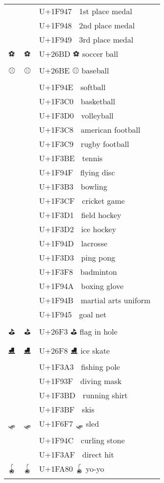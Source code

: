\documentclass[a4paper,12pt]{ltjarticle}
\newcommand{\fontA}[1]{{\fontspec[RawFeature={mode=harf,+dist,+ccmp}]{Segoe UI Emoji} #1}}
\newcommand{\fontB}[1]{{\fontspec[RawFeature={mode=harf,+dist,+ccmp}]{Noto Color Emoji} #1}}
\begin{document}
\begin{longtable}[c]{ccp{0.8\linewidth}}
\fontA{🥇}&\fontB{🥇}&U+1F947 🥇 1st place medal\\
\fontA{🥈}&\fontB{🥈}&U+1F948 🥈 2nd place medal\\
\fontA{🥉}&\fontB{🥉}&U+1F949 🥉 3rd place medal\\
\fontA{⚽}&\fontB{⚽}&U+26BD ⚽ soccer ball\\
\fontA{⚾}&\fontB{⚾}&U+26BE ⚾ baseball\\
\fontA{🥎}&\fontB{🥎}&U+1F94E 🥎 softball\\
\fontA{🏀}&\fontB{🏀}&U+1F3C0 🏀 basketball\\
\fontA{🏐}&\fontB{🏐}&U+1F3D0 🏐 volleyball\\
\fontA{🏈}&\fontB{🏈}&U+1F3C8 🏈 american football\\
\fontA{🏉}&\fontB{🏉}&U+1F3C9 🏉 rugby football\\
\fontA{🎾}&\fontB{🎾}&U+1F3BE 🎾 tennis\\
\fontA{🥏}&\fontB{🥏}&U+1F94F 🥏 flying disc\\
\fontA{🎳}&\fontB{🎳}&U+1F3B3 🎳 bowling\\
\fontA{🏏}&\fontB{🏏}&U+1F3CF 🏏 cricket game\\
\fontA{🏑}&\fontB{🏑}&U+1F3D1 🏑 field hockey\\
\fontA{🏒}&\fontB{🏒}&U+1F3D2 🏒 ice hockey\\
\fontA{🥍}&\fontB{🥍}&U+1F94D 🥍 lacrosse\\
\fontA{🏓}&\fontB{🏓}&U+1F3D3 🏓 ping pong\\
\fontA{🏸}&\fontB{🏸}&U+1F3F8 🏸 badminton\\
\fontA{🥊}&\fontB{🥊}&U+1F94A 🥊 boxing glove\\
\fontA{🥋}&\fontB{🥋}&U+1F94B 🥋 martial arts uniform\\
\fontA{🥅}&\fontB{🥅}&U+1F945 🥅 goal net\\
\fontA{⛳}&\fontB{⛳}&U+26F3 ⛳ flag in hole\\
\fontA{⛸}&\fontB{⛸}&U+26F8 ⛸ ice skate\\
\fontA{🎣}&\fontB{🎣}&U+1F3A3 🎣 fishing pole\\
\fontA{🤿}&\fontB{🤿}&U+1F93F 🤿 diving mask\\
\fontA{🎽}&\fontB{🎽}&U+1F3BD 🎽 running shirt\\
\fontA{🎿}&\fontB{🎿}&U+1F3BF 🎿 skis\\
\fontA{🛷}&\fontB{🛷}&U+1F6F7 🛷 sled\\
\fontA{🥌}&\fontB{🥌}&U+1F94C 🥌 curling stone\\
\fontA{🎯}&\fontB{🎯}&U+1F3AF 🎯 direct hit\\
\fontA{🪀}&\fontB{🪀}&U+1FA80 🪀 yo-yo\\

\end{longtable}
\end{document}
